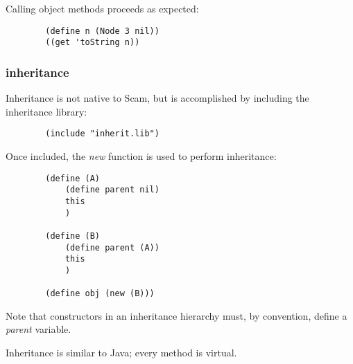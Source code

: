 \documentclass{article}
\begin{document}
    Calling object methods proceeds as expected:

\begin{verbatim}
        (define n (Node 3 nil))
        ((get 'toString n))
\end{verbatim}


\subsubsection*{inheritance}

    Inheritance is not native to Scam, but is accomplished by 
    including the inheritance library:
    
\begin{verbatim}
        (include "inherit.lib")
\end{verbatim}

     Once included, the {\it new} function is used to perform
     inheritance:

\begin{verbatim}
        (define (A)
            (define parent nil)
            this
            )

        (define (B)
            (define parent (A))
            this
            )
    
        (define obj (new (B)))
\end{verbatim}

    Note that constructors in an inheritance hierarchy must, by
    convention, define a {\it parent} variable.

    Inheritance is similar to Java; every method is virtual.
\end{document}
